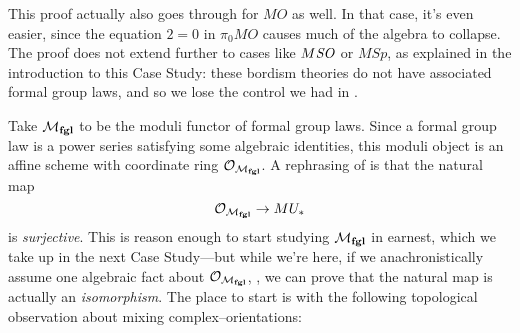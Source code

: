 \begin{remark}
This proof actually also goes through for \(MO\) as well.  In that case, it's even easier, since the equation \(2 = 0\) in \(\pi_0 MO\) causes much of the algebra to collapse.  The proof does not extend further to cases like \(M\mathit{SO}\) or \(M\mathit{Sp}\), as explained in the introduction to this Case Study: these bordism theories do not have associated formal group laws, and so we lose the control we had in .
\end{remark}

Take \(\mathcal{M}_{\mathbf{fgl}}\) to be the moduli functor of formal group laws.  Since a formal group law is a power series satisfying some algebraic identities, this moduli object is an affine scheme with coordinate ring \(\mathcal{O}_{\mathcal{M}_{\mathbf{fgl}}}\).  A rephrasing of  is that the natural map \[\mathcal{O}_{\mathcal{M}_{\mathbf{fgl}}} \to MU_*\] is \emph{surjective}.  This is reason enough to start studying \(\mathcal{M}_{\mathbf{fgl}}\) in earnest, which we take up in the next Case Study---but while we're here, if we anachronistically assume one algebraic fact about \(\mathcal{O}_{\mathcal{M}_{\mathbf{fgl}}}\), , we can prove that the natural map is actually an \emph{isomorphism}.  The place to start is with the following topological observation about mixing complex--orientations:


